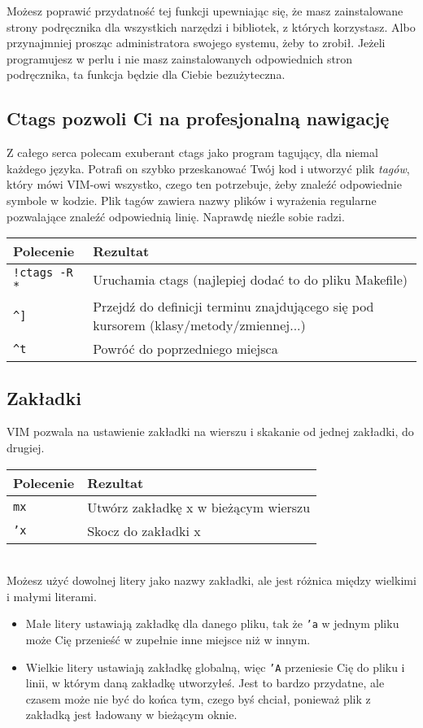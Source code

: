 \documentclass[a4paper,12pt]{article}
\begin{document}
\noindent
Możesz poprawić przydatność tej funkcji upewniając się, że masz zainstalowane strony podręcznika dla wszystkich narzędzi i bibliotek, z których korzystasz. Albo przynajmniej prosząc administratora swojego systemu, żeby to zrobił. Jeżeli programujesz w perlu i nie masz zainstalowanych odpowiednich stron podręcznika, ta funkcja będzie dla Ciebie bezużyteczna. \\
\subsection{Ctags pozwoli Ci na profesjonalną nawigację}
Z całego serca polecam exuberant ctags jako program tagujący, dla niemal każdego języka. Potrafi on szybko przeskanować Twój kod i utworzyć plik {\it tagów}, który mówi VIM-owi wszystko, czego ten potrzebuje, żeby znaleźć odpowiednie symbole w kodzie. Plik tagów zawiera nazwy plików i wyrażenia regularne pozwalające znaleźć odpowiednią linię. Naprawdę nieźle sobie radzi.

\begin{tabular}{ l | p{} }
{\bf Polecenie} & {\bf Rezultat} \\ \hline
{\tt !ctags -R *} & Uruchamia ctags (najlepiej dodać to do pliku Makefile) \\
{\tt \^{}]} & Przejdź do definicji terminu znajdującego się pod kursorem (klasy/metody/zmiennej...)\\
{\tt \^{}t} & Powróć do poprzedniego miejsca\\ \hline
\end{tabular}
\subsection{Zakładki}
VIM pozwala na ustawienie zakładki na wierszu i skakanie od jednej zakładki, do drugiej.

\begin{tabular}{ l | p{} }
{\bf Polecenie} & {\bf Rezultat} \\ \hline
{\tt mx} & Utwórz zakładkę x w bieżącym wierszu\\
{\tt 'x} & Skocz do zakładki x\\ \hline
\end{tabular}\\

\noindent
Możesz użyć dowolnej litery jako nazwy zakładki, ale jest różnica między wielkimi i małymi literami.\\
\begin{itemize}
    \item Małe litery ustawiają zakładkę dla danego pliku, tak że {\tt 'a} w jednym pliku może Cię przenieść w zupełnie inne miejsce niż w innym.
    \item Wielkie litery ustawiają zakładkę globalną, więc {\tt 'A} przeniesie Cię do pliku i linii, w którym daną zakładkę utworzyłeś. Jest to bardzo przydatne, ale czasem może nie być do końca tym, czego byś chciał, ponieważ plik z zakładką jest ładowany w bieżącym oknie.
\end{itemize}
\end{document}
